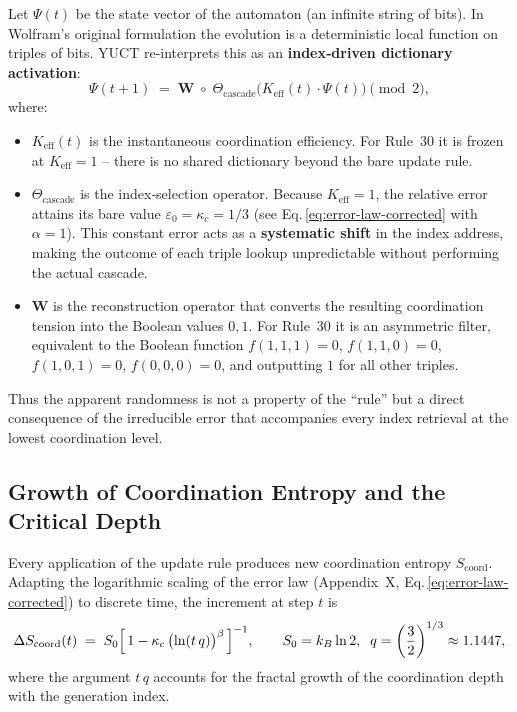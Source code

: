 \documentclass[12pt,a4paper]{article}
\newcommand{\Keff}{K_{\mathrm{eff}}}
\begin{document}
{Let \(\Psi(t)\) be the state vector of the automaton (an infinite string of
bits). In Wolfram's original formulation the evolution is a deterministic local
function on triples of bits. YUCT re‑interprets this as an \textbf{index‑driven
	dictionary activation}:
\begin{equation}
	\Psi(t+1) \;=\; \mathbf{W}\;\circ\;
	\Theta_{\mathrm{cascade}}\!\bigl(\Keff(t)\cdot\Psi(t)\bigr)
	\pmod{2},
	\label{eq:rule30-ypsdc}
\end{equation}
where:
\begin{itemize}
	\item \(\Keff(t)\) is the instantaneous coordination efficiency. For
	Rule~30 it is frozen at \(\Keff = 1\) – there is no shared dictionary
	beyond the bare update rule.
	\item \(\Theta_{\mathrm{cascade}}\) is the index‑selection operator. Because
	\(\Keff=1\), the relative error attains its bare value
	\(\varepsilon_0 = \kappa_c = 1/3\) (see Eq.\,\eqref{eq:error-law-corrected}
	with \(\alpha=1\)). This constant error acts as a \textbf{systematic shift}
	in the index address, making the outcome of each triple lookup
	unpredictable without performing the actual cascade.
	\item \(\mathbf{W}\) is the reconstruction operator that converts the
	resulting coordination tension into the Boolean values \(0,1\). For Rule~30
	it is an asymmetric filter, equivalent to the Boolean function
	\(f(1,1,1)=0\), \(f(1,1,0)=0\), \(f(1,0,1)=0\), \(f(0,0,0)=0\), and
	outputting \(1\) for all other triples.
\end{itemize}
Thus the apparent randomness is not a property of the ``rule'' but a direct
consequence of the irreducible error that accompanies every index retrieval at
the lowest coordination level.

\subsection{Growth of Coordination Entropy and the Critical Depth}
\label{subsec:entropy-growth}

Every application of the update rule produces new coordination entropy
\(S_{\mathrm{coord}}\). Adapting the logarithmic scaling of the error law
(Appendix~X, Eq.\,\eqref{eq:error-law-corrected}) to discrete time, the
increment at step \(t\) is
\begin{equation}
	\Delta S_{\mathrm{coord}}(t) \;=\;
	S_{0}\Bigl[\,1 - \kappa_c\,\bigl(\ln(t\,q)\bigr)^{\beta}\,\Bigr]^{-1},
	\qquad
	S_{0}=k_{B}\ln 2,\;\;
	q = \left(\frac{3}{2}\right)^{1/3}\approx 1.1447,
	\label{eq:deltaS}
\end{equation}
where the argument \(t\,q\) accounts for the fractal growth of the
coordination depth with the generation index.

}
\end{document}
